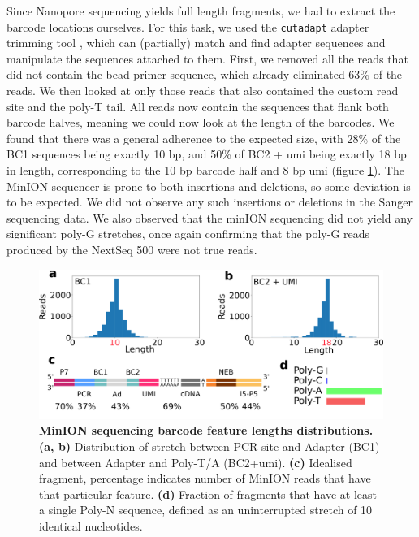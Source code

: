 Since Nanopore sequencing yields full length fragments, we had to extract the barcode locations ourselves. For this task, we used the \verb|cutadapt| adapter trimming tool \citep{martin2011}, which can (partially) match and find adapter sequences and manipulate the sequences attached to them. First, we removed all the reads that did not contain the bead primer sequence, which already eliminated 63\% of the reads. We then looked at only those reads that also contained the custom read site and the poly-T tail. All reads now contain the sequences that flank both barcode halves, meaning we could now look at the length of the barcodes. We found that there was a general adherence to the expected size, with 28\% of the BC1 sequences being exactly 10 bp, and 50\% of BC2 + \acrshort{umi} being exactly 18 bp in length, corresponding to the 10 bp barcode half and 8 bp \acrshort{umi} (figure \ref{fig:seq_minion}). The MinION sequencer is prone to both insertions and deletions, so some deviation is to be expected. We did not observe any such insertions or deletions in the Sanger sequencing data. We also observed that the minION sequencing did not yield any significant poly-G stretches, once again confirming that the poly-G reads produced by the NextSeq 500 were not true reads.\pms

\begin{figure}[ht]
\centerfloat
\includegraphics[width=\textwidth]{./ims/seq_minion.png}
\caption[MinION sequencing barcode feature lengths distributions]{\textbf{MinION sequencing barcode feature lengths distributions.} \textbf{(a, b)} Distribution of stretch between PCR site and Adapter (BC1) and between Adapter and Poly-T/A (BC2+\acrshort{umi}). \textbf{(c)} Idealised fragment, percentage indicates number of MinION reads that have that particular feature. \textbf{(d)} Fraction of fragments that have at least a single Poly-N sequence, defined as an uninterrupted stretch of 10 identical nucleotides.}
\label{fig:seq_minion}
\end{figure}
